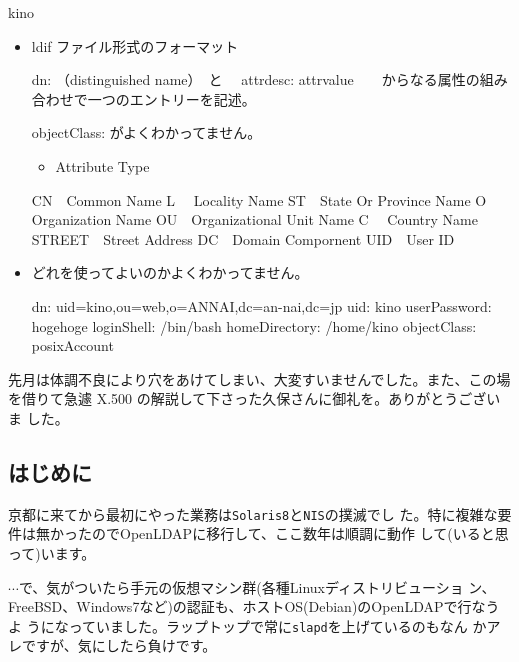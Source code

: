 \documentclass[mingoth,a4paper]{jsarticle}
\begin{document}
\begin{prework}{ kino }
  \begin{itemize}
  \item ldif ファイル形式のフォーマット
    \begin{commandline}
    dn: （distinguished name）　と　
    attrdesc: attrvalue　　からなる属性の組み合わせで一つのエントリーを記述。
    \end{commandline}
    objectClass: がよくわかってません。
    \begin{itemize}
    \item Attribute Type
    \end{itemize}
    \begin{commandline}
      CN　Common Name
      L　 Locality Name
      ST　State Or Province Name
      O　 Organization Name
      OU　Organizational Unit Name
      C　 Country Name
      STREET　Street Address
      DC　Domain Compornent
      UID　User ID
    \end{commandline}
  \item どれを使ってよいのかよくわかってません。
    \begin{commandline}
      dn: uid=kino,ou=web,o=ANNAI,dc=an-nai,dc=jp
      uid: kino
      userPassword: hogehoge
      loginShell: /bin/bash
      homeDirectory: /home/kino
      objectClass: posixAccount
    \end{commandline}
  \end{itemize}
\end{prework}

\clearpage


\vspace{1em}%
先月は体調不良により穴をあけてしまい、大変すいませんでした。また、この場
を借りて急遽 X.500 の解説して下さった久保さんに御礼を。ありがとうございま
した。

\subsection{はじめに}

京都に来てから最初にやった業務は\texttt{Solaris8}と\texttt{NIS}の撲滅でし
た。特に複雑な要件は無かったのでOpenLDAPに移行して、ここ数年は順調に動作
して(いると思って)います。

$\cdots$で、気がついたら手元の仮想マシン群(各種Linuxディストリビューショ
ン、FreeBSD、Windows7など)の認証も、ホストOS(Debian)のOpenLDAPで行なうよ
うになっていました。ラップトップで常に\texttt{slapd}を上げているのもなん
かアレですが、気にしたら負けです。
\end{document}
